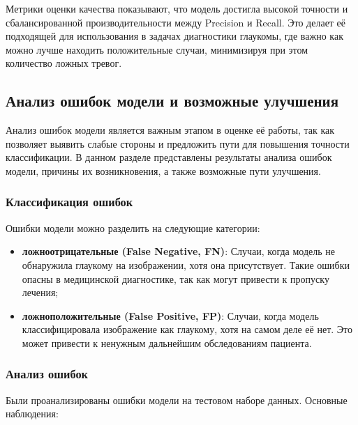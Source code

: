 {    Метрики оценки качества показывают, что модель достигла высокой точности и сбалансированной производительности между Precision и Recall. Это делает её подходящей для использования в задачах диагностики глаукомы, где важно как можно лучше находить положительные случаи, минимизируя при этом количество ложных тревог.

    \vspace{13pt}
    \subsection{Анализ ошибок модели и возможные улучшения}

    Анализ ошибок модели является важным этапом в оценке её работы, так как позволяет выявить слабые стороны и предложить пути для повышения точности классификации. В данном разделе представлены результаты анализа ошибок модели, причины их возникновения, а также возможные пути улучшения.

    \subsubsection*{Классификация ошибок}

    Ошибки модели можно разделить на следующие категории:

    \begin{itemize}
        \item \textbf{ложноотрицательные (False Negative, FN)}: Случаи, когда модель не обнаружила глаукому на изображении, хотя она присутствует. Такие ошибки опасны в медицинской диагностике, так как могут привести к пропуску лечения;
        \item \textbf{ложноположительные (False Positive, FP)}: Случаи, когда модель классифицировала изображение как глаукому, хотя на самом деле её нет. Это может привести к ненужным дальнейшим обследованиям пациента.
    \end{itemize}

    \subsubsection*{Анализ ошибок}

    Были проанализированы ошибки модели на тестовом наборе данных. Основные наблюдения:

}
